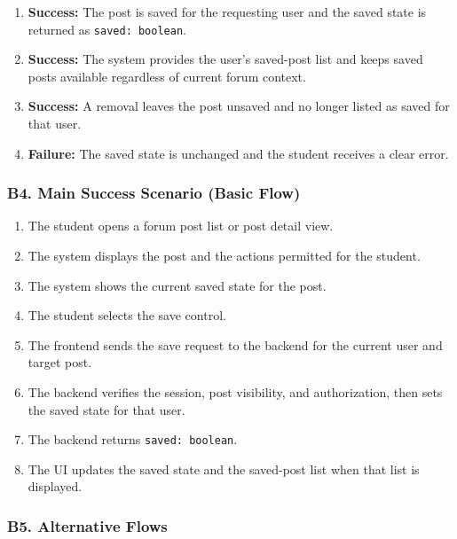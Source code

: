 \documentclass[12pt]{article}
\begin{document}
\begin{enumerate}
\item \textbf{Success:} The post is saved for the requesting user and the saved state is returned as \texttt{saved: boolean}.
\item \textbf{Success:} The system provides the user's saved-post list and keeps saved posts available regardless of current forum context.
\item \textbf{Success:} A removal leaves the post unsaved and no longer listed as saved for that user.
\item \textbf{Failure:} The saved state is unchanged and the student receives a clear error.
\end{enumerate}
\par\medskip

\hypertarget{sec:b4-main-success-scenario-basic-flow}{}
\subsubsection*{B4. Main Success Scenario (Basic Flow)}
\par\medskip

\begin{enumerate}
\item The student opens a forum post list or post detail view.
\item The system displays the post and the actions permitted for the student.
\item The system shows the current saved state for the post.
\item The student selects the save control.
\item The frontend sends the save request to the backend for the current user and target post.
\item The backend verifies the session, post visibility, and authorization, then sets the saved state for that user.
\item The backend returns \texttt{saved: boolean}.
\item The UI updates the saved state and the saved-post list when that list is displayed.
\end{enumerate}
\par\medskip

\hypertarget{sec:b5-alternative-flows}{}
\subsubsection*{B5. Alternative Flows}
\par\medskip
\end{document}
